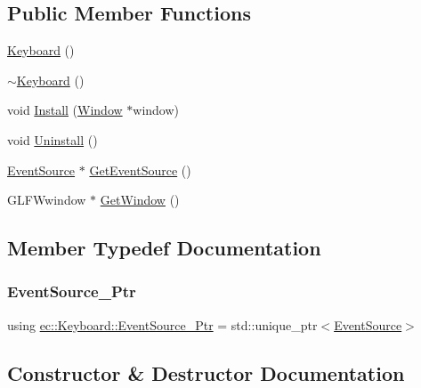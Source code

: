 \subsection*{Public Member Functions}
\begin{DoxyCompactItemize}
\item 
\mbox{\hyperlink{classec_1_1_keyboard_aca1d01cce4b8449083c32e2a167a3448}{Keyboard}} ()
\item 
\mbox{\hyperlink{classec_1_1_keyboard_a817f6cd6ea29898c6651dee24de59ba5}{$\sim$\+Keyboard}} ()
\item 
void \mbox{\hyperlink{classec_1_1_keyboard_ab6e5cd1eeb0346198895203918a6c6d5}{Install}} (\mbox{\hyperlink{classec_1_1_window}{Window}} $\ast$window)
\item 
void \mbox{\hyperlink{classec_1_1_keyboard_a06d27f5a8cdc6800b0792beb78699187}{Uninstall}} ()
\item 
\mbox{\hyperlink{classec_1_1_event_source}{Event\+Source}} $\ast$ \mbox{\hyperlink{classec_1_1_keyboard_a4893086d1994d0d507a021cbbeed70c6}{Get\+Event\+Source}} ()
\item 
G\+L\+F\+Wwindow $\ast$ \mbox{\hyperlink{classec_1_1_keyboard_a1674d65a5a014c30d129e9308f13051b}{Get\+Window}} ()
\end{DoxyCompactItemize}


\subsection{Member Typedef Documentation}
\mbox{\label{classec_1_1_keyboard_a9d797ac5b4d42f3b586091bcc14e6343}} 
\subsubsection{\texorpdfstring{Event\+Source\+\_\+\+Ptr}{EventSource\_Ptr}}
{\footnotesize\ttfamily using \mbox{\hyperlink{classec_1_1_keyboard_a9d797ac5b4d42f3b586091bcc14e6343}{ec\+::\+Keyboard\+::\+Event\+Source\+\_\+\+Ptr}} =  std\+::unique\+\_\+ptr$<$\mbox{\hyperlink{classec_1_1_event_source}{Event\+Source}}$>$}



\subsection{Constructor \& Destructor Documentation}
\mbox{\label{classec_1_1_keyboard_aca1d01cce4b8449083c32e2a167a3448}} 
